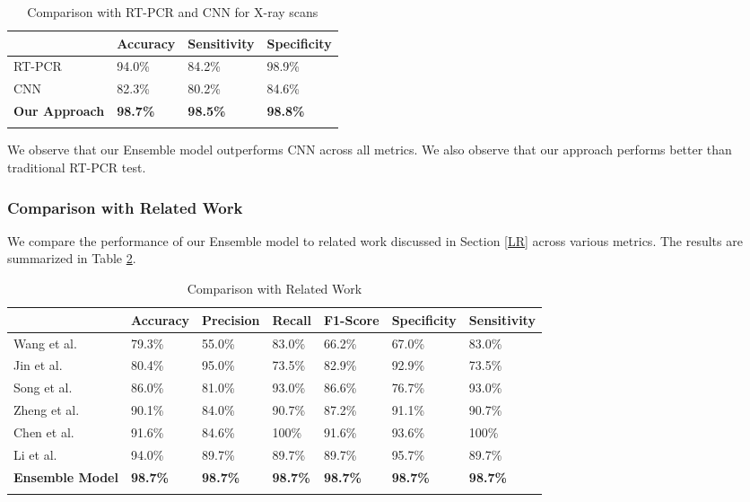  \begin{longtable}{| p{} | p{} |  p{} |   p{} |} 
    \hline
& \textbf{Accuracy} & \textbf{Sensitivity} & \textbf{Specificity} \\
\hline

			RT-PCR      &94.0\%   &84.2\%    &98.9\%  
\\\hline
			CNN    &82.3\%   &80.2\%    &84.6\% 
\\\hline
			\textbf{Our Approach}   &\textbf{98.7\%}   &\textbf{98.5\%}    &\textbf{98.8\%} 
\\\hline
 \caption{Comparison with RT-PCR and CNN for X-ray scans}  \label{tab:compCT}
    \end{longtable}
\vspace{-1em}

We observe that our Ensemble model outperforms CNN across all metrics. We also observe that our approach performs better than traditional RT-PCR test.  

\subsubsection{Comparison with Related Work}

We compare the performance of our Ensemble model to related work discussed in Section \ref{LR} across various metrics. The results are summarized in Table \ref{tab:relWorkCT}.


\vspace{1em}
 \begin{longtable}{| p{} |  p{} |   p{} | p{} | p{} | p{} | p{} |} 
    \hline
& \textbf{Accuracy} & \textbf{Precision} & \textbf{Recall} & \textbf{F1-Score} & \textbf{Specificity} & \textbf{Sensitivity} \\
\hline
Wang et al. \cite{WBX+2020} &79.3\%    &55.0\%     &83.0\%   &66.2\%    &67.0\%     &83.0\%
\\\hline
Jin et al. \cite{JCW+2020} &80.4\%    &95.0\%     &73.5\%   &82.9\%    &92.9\%     &73.5\%
\\\hline
Song et al. \cite{SZL+2020} &86.0\%    &81.0\%     &93.0\%   &86.6\%    &76.7\%     &93.0\%
\\\hline
Zheng et al. \cite{CXZ+2020}   &90.1\%    &84.0\%     &90.7\%   &87.2\%    &91.1\%     &90.7\%
\\\hline
Chen et al. \cite{CJL+2020}   &91.6\%    &84.6\%     &100\%   &91.6\%    &93.6\%     &100\%
\\\hline
Li et al. \cite{LLL+2020}   &94.0\%    &89.7\%     &89.7\%   &89.7\%    &95.7\%     &89.7\%
\\\hline
\textbf{Ensemble Model}    &\textbf{98.7\%}   &\textbf{98.7\%}    &\textbf{98.7\%}    &\textbf{98.7\%}   &\textbf{98.7\%}   &\textbf{98.7\%} 
\\\hline
 \caption{Comparison with Related Work}  \label{tab:relWorkCT}

    \end{longtable}
\vspace{-1em}

